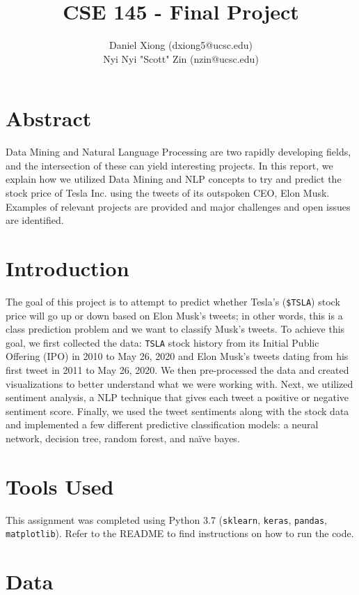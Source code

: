\documentclass[12pt, notitlepage]{article}
\title{CSE 145 - Final Project}
\author{Daniel Xiong (dxiong5@ucsc.edu)\\
		Nyi Nyi "Scott" Zin (nzin@ucsc.edu)}
\date{}
\begin{document}
\maketitle

\section{Abstract}
Data Mining and Natural Language Processing are two rapidly developing fields, and the intersection of these can yield interesting projects. In this report, we explain how we utilized Data Mining and NLP concepts to try and predict the stock price of Tesla Inc. using the tweets of its outspoken CEO, Elon Musk. Examples of relevant projects are provided and major challenges and open issues are identified.

\section{Introduction}
The goal of this project is to attempt to predict whether Tesla's (\texttt{\$TSLA}) stock price will go up or down based on Elon Musk's tweets; in other words, this is a class prediction problem and we want to classify Musk's tweets. To achieve this goal, we first collected the data: \texttt{TSLA} stock history from its Initial Public Offering (IPO) in 2010 to May 26, 2020 and Elon Musk's tweets dating from his first tweet in 2011 to May 26, 2020. We then pre-processed the data and created visualizations to better understand what we were working with. Next, we utilized sentiment analysis, a NLP technique that gives each tweet a positive or negative sentiment score. Finally, we used the tweet sentiments along with the stock data and implemented a few different predictive classification models: a neural network, decision tree, random forest, and naïve bayes.

\section{Tools Used}
This assignment was completed using Python 3.7 (\texttt{sklearn}, \texttt{keras}, \texttt{pandas}, \texttt{matplotlib}). Refer to the README to find instructions on how to run the code.

\section{Data}
\end{document}

